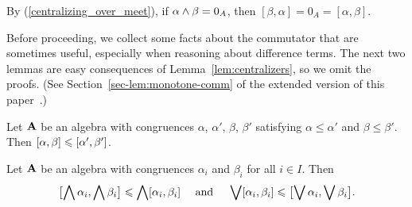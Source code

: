 \begin{rem}
By (\ref{centralizing_over_meet}),
if $\alpha \wedge \beta = 0_{A}$,
then %
$[\beta, \alpha] = 0_A = [\alpha, \beta]$.
\end{rem}


Before proceeding, we collect some facts about the commutator that are
sometimes useful, especially when reasoning about difference terms.
The next two lemmas are easy consequences
of Lemma~\ref{lem:centralizers}, so
we omit the proofs.
(See Section~\ref{sec-lem:monotone-comm}
of the extended version of this paper~\extendedref.)

\begin{lem}
  \label{lem:monotone-comm}
  Let $\mathbf{A}$ be an algebra
  with congruences
  $\alpha$, $\alpha'$, $\beta$, $\beta'$ satisfying
  $\alpha\leq \alpha'$ and $\beta \leq \beta'$.
  Then $[\alpha, \beta] \leqslant [\alpha', \beta']$.
\end{lem}

\begin{lem}
  \label{lem:complete-meet-join-monotone}
Let $\mathbf{A}$ be an algebra with congruences
$\alpha_i$ and
$\beta_i$ %
for all $i \in I$.
Then
\[
\bigl[ \bigwedge \alpha_i, \bigwedge \beta_i \bigr] \leqslant
\bigwedge [\alpha_i, \beta_i]
\quad \text{ and } \quad
\bigvee [\alpha_i, \beta_i] \leqslant
\bigl[ \bigvee \alpha_i, \bigvee \beta_i\bigr].
\]
\end{lem}


